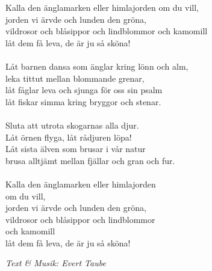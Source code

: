 \vspace{10pt}
Kalla den änglamarken eller himlajorden om du vill,\\
jorden vi ärvde och lunden den gröna,\\
vildrosor och blåsippor och lindblommor och kamomill\\
låt dem få leva, de är ju så sköna!\\
\\
Låt barnen dansa som änglar kring lönn och alm,\\
leka tittut mellan blommande grenar,\\
låt fåglar leva och sjunga för oss sin psalm\\
låt fiskar simma kring bryggor och stenar.\\
\\
Sluta att utrota skogarnas alla djur.\\
Låt örnen flyga, låt rådjuren löpa!\\
Låt sista älven som brusar i vår natur\\
brusa alltjämt mellan fjällar och gran och fur.\\
\\
Kalla den änglamarken eller himlajorden\\
om du vill,\\
jorden vi ärvde och lunden den gröna,\\
vildrosor och blåsippor och lindblommor\\
och kamomill\\
låt dem få leva, de är ju så sköna!\par
\vspace{10pt}
{\footnotesize\textit{Text \& Musik: Evert Taube}}
